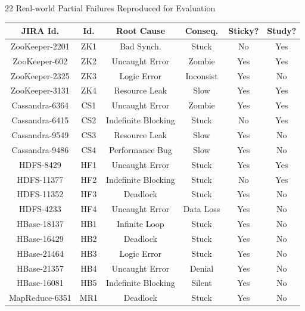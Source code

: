 \documentclass[aspectratio=169]{beamer}
\begin{document}
\begin{frame}[allowframebreaks]{22 Real-world Partial Failures Reproduced for Evaluation}
    \begin{longtable}{c|c|c|c|c|c}
        \toprule
        JIRA Id.       & Id. & Root Cause            & Conseq.   & Sticky? & Study? \\
        \midrule
        ZooKeeper-2201 & ZK1 & Bad Synch.            & Stuck     & No      & Yes    \\
        ZooKeeper-602  & ZK2 & Uncaught Error        & Zombie    & Yes     & Yes    \\
        ZooKeeper-2325 & ZK3 & Logic Error           & Inconsist & Yes     & No     \\
        ZooKeeper-3131 & ZK4 & Resource  Leak        & Slow      & Yes     & Yes    \\
        \midrule
        Cassandra-6364 & CS1 & Uncaught  Error       & Zombie    & Yes     & Yes    \\
        Cassandra-6415 & CS2 & Indefinite Blocking   & Stuck     & No      & Yes    \\
        Cassandra-9549 & CS3 & Resource Leak         & Slow      & Yes     & No     \\
        Cassandra-9486 & CS4 & Performance   Bug     & Slow      & Yes     & No     \\
        \midrule
        HDFS-8429      & HF1 & Uncaught Error        & Stuck     & Yes     & Yes    \\
        HDFS-11377     & HF2 & Indefinite Blocking   & Stuck     & No      & Yes    \\
        HDFS-11352     & HF3 & Deadlock              & Stuck     & Yes     & No     \\
        HDFS-4233      & HF4 & Uncaught  Error       & Data Loss & Yes     & No     \\
        \midrule
        HBase-18137    & HB1 & Infinite Loop         & Stuck     & Yes     & No     \\
        HBase-16429    & HB2 & Deadlock              & Stuck     & Yes     & No     \\
        HBase-21464    & HB3 & Logic Error           & Stuck     & Yes     & No     \\
        HBase-21357    & HB4 & Uncaught Error        & Denial    & Yes     & No     \\
        HBase-16081    & HB5 & Indefinite Blocking   & Silent    & Yes     & No     \\
        \midrule
        MapReduce-6351 & MR1 & Deadlock              & Stuck     & Yes     & No     \\

\end{longtable}
\end{frame}
\end{document}
